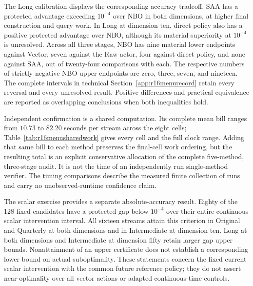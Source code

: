 The Long calibration displays the corresponding accuracy tradeoff. SAA has
a protected advantage exceeding $10^{-4}$ over NBO in both dimensions, at
higher final construction and query work. In Long at dimension ten, direct
policy also has a positive protected advantage over NBO, although its
material superiority at $10^{-4}$ is unresolved. Across all three stages,
NBO has nine material lower endpoints against Vector, seven against the Raw
actor, four against direct policy, and none against SAA, out of twenty-four
comparisons with each. The respective numbers of strictly negative NBO
upper endpoints are zero, three, seven, and nineteen. The complete intervals
in technical Section~\ref{app:r16menurecord} retain every reversal and every
unresolved result. Positive differences and practical equivalence are
reported as overlapping conclusions when both inequalities hold.

Independent confirmation is a shared computation. Its complete mean bill
ranges from $10.73$ to $82.20$ seconds per stream across the eight cells;
Table~\ref{tab:r16menusharedwork} gives every cell and the full clock range.
Adding that same bill to each method preserves the final-cell work
ordering, but the resulting total is an explicit conservative allocation of
the complete five-method, three-stage audit. It is not the time of an
independently run single-method verifier. The timing comparisons describe
the measured finite collection of runs and carry no unobserved-runtime
confidence claim.



The scalar exercise provides a separate absolute-accuracy result. Eighty of
the 128 fixed candidates have a protected gap below $10^{-4}$ over their
entire continuous scalar intervention interval. All sixteen streams attain
this criterion in Original and Quarterly at both dimensions and in
Intermediate at dimension ten. Long at both dimensions and Intermediate at
dimension fifty retain larger gap upper bounds. Nonattainment of an upper
certificate does not establish a corresponding lower bound on actual
suboptimality. These statements concern the fixed current scalar
intervention with the common future reference policy; they do not assert
near-optimality over all vector actions or adapted continuous-time controls.
